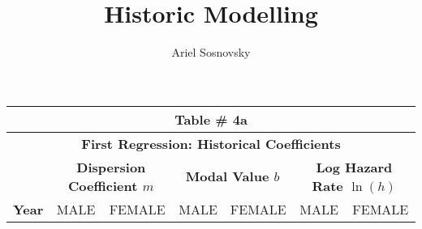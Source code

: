 \documentclass[10pt, titlepage]{article}%
\author{Ariel Sosnovsky}
\begin{document}
\title{Historic Modelling}
\maketitle

\clearpage

\begin{table}
  \begin{tabular}{||l|c|c|c|c|c|c||}
  \hline\hline
  \multicolumn{7}{||c||}{Table \# 4a } \\ \hline\hline
  \multicolumn{7}{||c||}{{\bf First Regression: Historical Coefficients}} \\ \hline\hline
  
  { } & 
  \multicolumn{2}{|c|}{ \bf Dispersion Coefficient $m$ } & 
  \multicolumn{2}{|c|}{ \bf Modal Value $b$ }& 
  \multicolumn{2}{|c||}{ \bf Log Hazard Rate $\ln(h)$ } \\ \hline\hline
  
  {\bf Year } &
  {MALE} & {FEMALE} &
  {MALE} & {FEMALE} &
  {MALE} & {FEMALE} \\ \hline\hline


\end{tabular}
\end{table}
\end{document}
